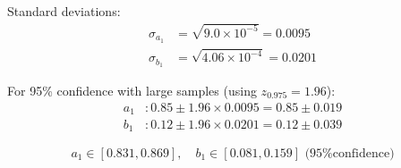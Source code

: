 \begin{example}
Standard deviations:
\begin{align*}
\sigma_{a_1} &= \sqrt{9.0 \times 10^{-5}} = 0.0095 \\
\sigma_{b_1} &= \sqrt{4.06 \times 10^{-4}} = 0.0201
\end{align*}

For 95\% confidence with large samples (using $z_{0.975} = 1.96$):
\begin{align*}
a_1 &: 0.85 \pm 1.96 \times 0.0095 = 0.85 \pm 0.019 \\
b_1 &: 0.12 \pm 1.96 \times 0.0201 = 0.12 \pm 0.039
\end{align*}

\begin{equation*}
\boxed{a_1 \in [0.831, 0.869], \quad b_1 \in [0.081, 0.159] \text{ (95\% confidence)}}
\end{equation*}
\end{example}

